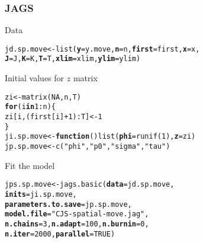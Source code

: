 \documentclass[color=usenames,dvipsnames]{beamer}\usepackage[]{graphicx}\usepackage[]{color}
\makeatletter
\newcommand{\hlnum}[1]{\textcolor[rgb]{0.69,0.494,0}{#1}}%
\newcommand{\hlstr}[1]{\textcolor[rgb]{0.749,0.012,0.012}{#1}}%
\newcommand{\hlopt}[1]{\textcolor[rgb]{0,0,0}{#1}}%
\newcommand{\hlstd}[1]{\textcolor[rgb]{0,0,0}{#1}}%
\newcommand{\hlkwa}[1]{\textcolor[rgb]{0,0,0}{\textbf{#1}}}%
\newcommand{\hlkwb}[1]{\textcolor[rgb]{0,0.341,0.682}{#1}}%
\newcommand{\hlkwc}[1]{\textcolor[rgb]{0,0,0}{\textbf{#1}}}%
\newcommand{\hlkwd}[1]{\textcolor[rgb]{0.004,0.004,0.506}{#1}}%
\newenvironment{kframe}{%
 \def\at@end@of@kframe{}%
 \ifinner\ifhmode%
  \def\at@end@of@kframe{\end{minipage}}%
  \begin{minipage}{\columnwidth}%
 \fi\fi%
 \def\FrameCommand##1{\hskip\@totalleftmargin \hskip-\fboxsep
 \colorbox{shadecolor}{##1}\hskip-\fboxsep
     \hskip-\linewidth \hskip-\@totalleftmargin \hskip\columnwidth}%
 \MakeFramed {\advance\hsize-\width
   \@totalleftmargin\z@ \linewidth\hsize
   \@setminipage}}%
 {\par\unskip\endMakeFramed%
 \at@end@of@kframe}
\newenvironment{knitrout}{}{} %
\makeatother
\begin{document}
\begin{frame}[fragile]
  \frametitle{JAGS}
  \small
  Data
\begin{knitrout}\scriptsize
{}\color{fgcolor}\begin{kframe}
\begin{alltt}
\hlstd{jd.sp.move} \hlkwb{<-} \hlkwd{list}\hlstd{(}\hlkwc{y}\hlstd{=y.move,} \hlkwc{n}\hlstd{=n,} \hlkwc{first}\hlstd{=first,} \hlkwc{x}\hlstd{=x,}
                   \hlkwc{J}\hlstd{=J,} \hlkwc{K}\hlstd{=K,} \hlkwc{T}\hlstd{=T,} \hlkwc{xlim}\hlstd{=xlim,} \hlkwc{ylim}\hlstd{=ylim)}
\end{alltt}
\end{kframe}
\end{knitrout}
  Initial values for $z$ matrix
\begin{knitrout}\scriptsize
{}\color{fgcolor}\begin{kframe}
\begin{alltt}
\hlstd{zi} \hlkwb{<-} \hlkwd{matrix}\hlstd{(}\hlnum{NA}\hlstd{, n, T)}
\hlkwa{for}\hlstd{(i} \hlkwa{in} \hlnum{1}\hlopt{:}\hlstd{n) \{}
    \hlstd{zi[i,(first[i]}\hlopt{+}\hlnum{1}\hlstd{)}\hlopt{:}\hlstd{T]} \hlkwb{<-} \hlnum{1}
    \hlstd{\}}
\hlstd{ji.sp.move} \hlkwb{<-} \hlkwa{function}\hlstd{()} \hlkwd{list}\hlstd{(}\hlkwc{phi}\hlstd{=}\hlkwd{runif}\hlstd{(}\hlnum{1}\hlstd{),} \hlkwc{z}\hlstd{=zi)}
\hlstd{jp.sp.move} \hlkwb{<-} \hlkwd{c}\hlstd{(}\hlstr{"phi"}\hlstd{,} \hlstr{"p0"}\hlstd{,} \hlstr{"sigma"}\hlstd{,} \hlstr{"tau"}\hlstd{)}
\end{alltt}
\end{kframe}
\end{knitrout}
  \pause
  \vfill
  Fit the model
\begin{knitrout}\scriptsize
{}\color{fgcolor}\begin{kframe}
\begin{alltt}
\hlstd{jps.sp.move} \hlkwb{<-} \hlkwd{jags.basic}\hlstd{(}\hlkwc{data}\hlstd{=jd.sp.move,}
                          \hlkwc{inits}\hlstd{=ji.sp.move,}
                          \hlkwc{parameters.to.save}\hlstd{=jp.sp.move,}
                          \hlkwc{model.file}\hlstd{=}\hlstr{"CJS-spatial-move.jag"}\hlstd{,}
                          \hlkwc{n.chains}\hlstd{=}\hlnum{3}\hlstd{,} \hlkwc{n.adapt}\hlstd{=}\hlnum{100}\hlstd{,} \hlkwc{n.burnin}\hlstd{=}\hlnum{0}\hlstd{,}
                          \hlkwc{n.iter}\hlstd{=}\hlnum{2000}\hlstd{,} \hlkwc{parallel}\hlstd{=}\hlnum{TRUE}\hlstd{)}
\end{alltt}
\end{kframe}
\end{knitrout}
\end{frame}
\end{document}
